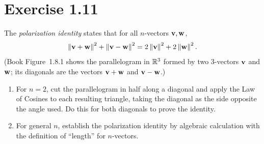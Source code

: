 \section*{Exercise 1.11}
\begin{exercise}
The \emph{polarization identity} states that for all $n$-vectors $\mathbf{v}, \mathbf{w}$,
\[
  \left\lVert \mathbf{v}+\mathbf{w} \right\rVert^2 + \left\lVert \mathbf{v}-\mathbf{w} \right\rVert^2
  = 2\left\lVert \mathbf{v} \right\rVert^2 + 2\left\lVert \mathbf{w} \right\rVert^2 .
\]
(Book Figure~1.8.1 shows the parallelogram in $\mathbb{R}^3$ formed by two 3-vectors
$\mathbf{v}$ and $\mathbf{w}$; its diagonals are the vectors $\mathbf{v}+\mathbf{w}$ and
$\mathbf{v}-\mathbf{w}$.)
\begin{enumerate}
  \item For $n = 2$, cut the parallelogram in half along a diagonal and apply the
        Law of Cosines to each resulting triangle, taking the diagonal as the side
        opposite the angle used. Do this for both diagonals to prove the identity.
  \item For general $n$, establish the polarization identity by algebraic calculation with the definition of
“length” for $n$-vectors.\end{enumerate}
\end{exercise}

